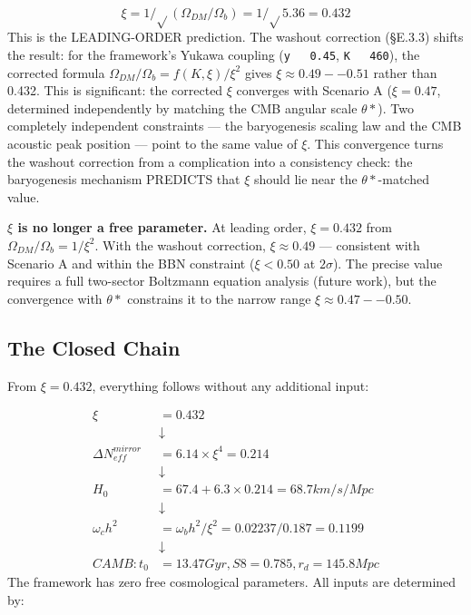 \documentclass[aps,prd,preprint,superscriptaddress,longbibliography]{revtex4-2}
\begin{document}
\begin{equation}
    \xi = 1/\sqrt{}(\Omega_{DM}/\Omega_b) = 1/\sqrt{}5.36 = 0.432
\end{equation}
This is the LEADING-ORDER prediction. The washout correction (\S{}E.3.3) shifts the result: for the framework's Yukawa coupling (\texttt{y ~ 0.45}, \texttt{K ~ 460}), the corrected formula $\Omega_{DM}/\Omega_b = f(K,\xi)/\xi^{2}$ gives $\xi \approx 0.49--0.51$ rather than 0.432. This is significant: the corrected $\xi$ converges with Scenario A ($\xi = 0.47$, determined independently by matching the CMB angular scale $\theta*$). Two completely independent constraints --- the baryogenesis scaling law and the CMB acoustic peak position --- point to the same value of $\xi$. This convergence turns the washout correction from a complication into a consistency check: the baryogenesis mechanism PREDICTS that $\xi$ should lie near the $\theta*$-matched value.

\textbf{$\xi$ is no longer a free parameter.} At leading order, $\xi = 0.432$ from $\Omega_{DM}/\Omega_b = 1/\xi^{2}$. With the washout correction, $\xi \approx 0.49$ --- consistent with Scenario A and within the BBN constraint ($\xi < 0.50$ at $2\sigma$). The precise value requires a full two-sector Boltzmann equation analysis (future work), but the convergence with $\theta*$ constrains it to the narrow range $\xi \approx 0.47--0.50$.



\subsection{The Closed Chain}

From $\xi = 0.432$, everything follows without any additional input:


\begin{align}
    \xi &= 0.432 \\
    & \downarrow \\
    \Delta N_{eff}^{mirror} &= 6.14 \times \xi^{4} = 0.214 \\
    & \downarrow \\
    H_{0} &= 67.4 + 6.3 \times 0.214 = 68.7 km/s/Mpc \\
    & \downarrow \\
    \omega_c h^{2} &= \omega_b h^{2} / \xi^{2} = 0.02237 / 0.187 = 0.1199 \\
    & \downarrow \\
    CAMB: t_{0} &= 13.47 Gyr, S8 = 0.785, r_d = 145.8 Mpc
\end{align}
The framework has zero free cosmological parameters. All inputs are determined by:
\end{document}
